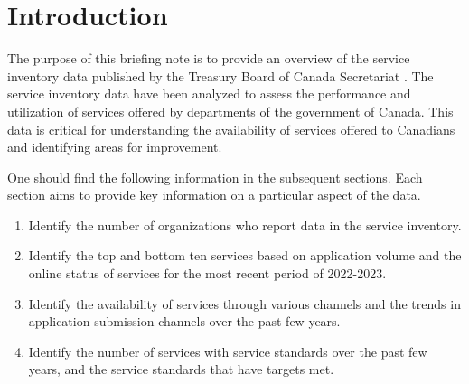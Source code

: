 \section{Introduction}

The purpose of this briefing note is to provide an overview of the service inventory data published by the Treasury Board of Canada Secretariat \cite{cite1}. The service inventory data have been analyzed to assess the performance and utilization of services offered by departments of the government of Canada. This data is critical for understanding the availability of services offered to Canadians and identifying areas for improvement.

One should find the following information in the subsequent sections. Each section aims to provide key information on a particular aspect of the data. 
\begin{tcolorbox}[title=Key Findings,boxrule=1pt]
    \begin{enumerate}
        \item Identify the number of organizations who report data in the service inventory.

        \item Identify the top and bottom ten services based on application volume and the online status of services for the most recent period of 2022-2023.

        \item Identify the availability of services through various channels and the trends in application submission channels over the past few years.

        \item Identify the number of services with service standards over the past few years, and the service standards that have targets met.
    \end{enumerate}
\end{tcolorbox}